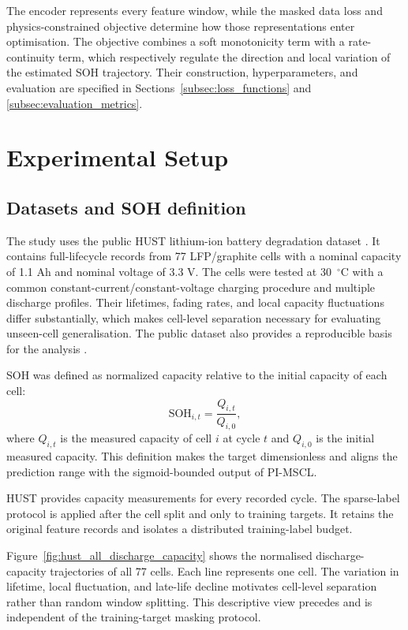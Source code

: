 \documentclass[pdflatex,sn-mathphys-num]{sn-jnl}
\begin{document}
The encoder represents every feature window, while the masked data loss and physics-constrained objective determine how those representations enter optimisation. The objective combines a soft monotonicity term with a rate-continuity term, which respectively regulate the direction and local variation of the estimated SOH trajectory. Their construction, hyperparameters, and evaluation are specified in Sections~\ref{subsec:loss_functions} and \ref{subsec:evaluation_metrics}.
\section{Experimental Setup}
\label{sec:experiments}

\subsection{Datasets and SOH definition}
\label{subsec:datasets}

The study uses the public HUST lithium-ion battery degradation dataset \cite{Yuan2022HUSTDataset}. It contains full-lifecycle records from 77 LFP/graphite cells with a nominal capacity of 1.1 Ah and nominal voltage of 3.3 V. The cells were tested at 30~$^{\circ}$C with a common constant-current/constant-voltage charging procedure and multiple discharge profiles. Their lifetimes, fading rates, and local capacity fluctuations differ substantially, which makes cell-level separation necessary for evaluating unseen-cell generalisation. The public dataset also provides a reproducible basis for the analysis \cite{ward2022principles}.

SOH was defined as normalized capacity relative to the initial capacity of each cell:
\begin{equation}
\mathrm{SOH}_{i,t}=\frac{Q_{i,t}}{Q_{i,0}},
\label{eq:soh_definition}
\end{equation}
where $Q_{i,t}$ is the measured capacity of cell $i$ at cycle $t$ and $Q_{i,0}$ is the initial measured capacity. This definition makes the target dimensionless and aligns the prediction range with the sigmoid-bounded output of PI-MSCL.

HUST provides capacity measurements for every recorded cycle. The sparse-label protocol is applied after the cell split and only to training targets. It retains the original feature records and isolates a distributed training-label budget.

Figure~\ref{fig:hust_all_discharge_capacity} shows the normalised discharge-capacity trajectories of all 77 cells. Each line represents one cell. The variation in lifetime, local fluctuation, and late-life decline motivates cell-level separation rather than random window splitting. This descriptive view precedes and is independent of the training-target masking protocol.
\end{document}

